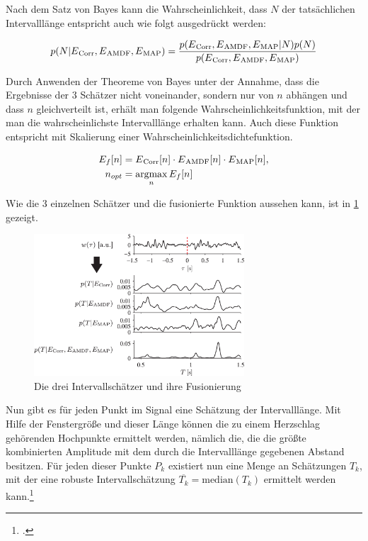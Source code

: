 	Nach dem Satz von Bayes kann die Wahrscheinlichkeit, dass $N$ der tatsächlichen Intervalllänge entspricht auch wie folgt ausgedrückt werden:
	
	\[
		p(N|E\textsubscript{Corr}, E\textsubscript{AMDF}, E\textsubscript{MAP}) = \frac{p(E\textsubscript{Corr}, E\textsubscript{AMDF}, E\textsubscript{MAP} | N) p(N)}{p(E\textsubscript{Corr}, E\textsubscript{AMDF}, E\textsubscript{MAP})}
	\]
	
	Durch Anwenden der Theoreme von Bayes unter der Annahme, dass die Ergebnisse der 3 Schätzer nicht voneinander, sondern nur von $n$ abhängen und dass $n$ gleichverteilt ist, erhält man folgende Wahrscheinlichkeitsfunktion, mit der man die wahrscheinlichste Intervalllänge erhalten kann. Auch diese Funktion entspricht mit Skalierung einer Wahrscheinlichkeitsdichtefunktion.
	
	\begin{align*}
		E_f[n] &= E\textsubscript{Corr}[n] \cdot E\textsubscript{AMDF}[n] \cdot E\textsubscript{MAP}[n],\\
		n_{opt} &= \operatorname*{argmax}_{n} E_f[n]	
	\end{align*}
	
	Wie die 3 einzelnen Schätzer und die fusionierte Funktion aussehen kann, ist in \ref{fig:estimator-fusion} gezeigt.
	
	\begin{figure}[H]
		\centering
		\includegraphics[width=0.7\textwidth]{pic/estimator-fusion.png}
		\caption[Intervallschätzer nach \citeauthor{Bruser2013}]{Die drei Intervallschätzer und ihre Fusionierung}
		\label{fig:estimator-fusion}
	\end{figure}
	
	Nun gibt es für jeden Punkt im Signal eine Schätzung der Intervalllänge. Mit Hilfe der Fenstergröße und dieser Länge können die zu einem Herzschlag gehörenden Hochpunkte ermittelt werden, nämlich die, die die größte kombinierten Amplitude mit dem durch die Intervalllänge gegebenen Abstand besitzen. Für jeden dieser Punkte $P_k$ existiert nun eine Menge an Schätzungen $T_k$, mit der eine robuste Intervallschätzung $\overline{T_k} = \text{median}(T_k)$ ermittelt werden kann.\footcites[Vgl. zu diesem Kapitel][]{Bruser2013}

